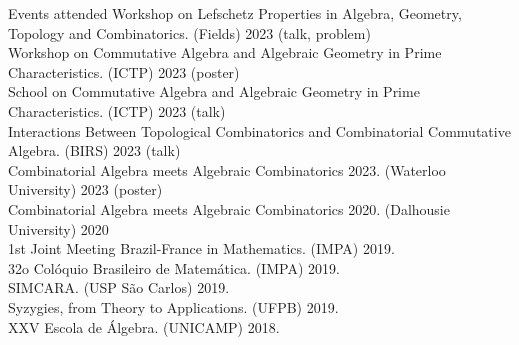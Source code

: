 \documentclass{resume} %
\begin{document}
\begin{rSection}{Events attended}
Workshop on Lefschetz Properties in Algebra, Geometry, Topology and Combinatorics. (Fields) 2023 (talk, problem)
\\ Workshop on Commutative Algebra and Algebraic Geometry in Prime Characteristics. (ICTP) 2023 (poster)
\\ School on Commutative Algebra and Algebraic Geometry in Prime Characteristics. (ICTP) 2023 (talk)
\\ Interactions Between Topological Combinatorics and Combinatorial Commutative Algebra. (BIRS) 2023 (talk)
\\ Combinatorial Algebra meets Algebraic Combinatorics 2023. (Waterloo University) 2023 (poster)%
\\ Combinatorial Algebra meets Algebraic Combinatorics 2020. (Dalhousie University) 2020
\\ 1st Joint Meeting Brazil-France in Mathematics. (IMPA) 2019.
\\ 32o Colóquio Brasileiro de Matemática. (IMPA) 2019.
\\ SIMCARA. (USP São Carlos) 2019.
\\ Syzygies, from Theory to Applications. (UFPB) 2019.
\\ XXV Escola de Álgebra. (UNICAMP) 2018.
\\
\end{rSection}


\end{document}
